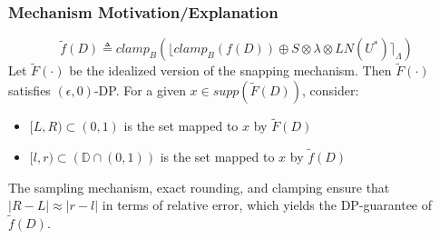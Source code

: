 \documentclass{beamer}
\begin{document}
\begin{frame}
    \frametitle{Mechanism Motivation/Explanation}
    \[ \tilde{f}(D) \triangleq clamp_{B} \left( \lfloor clamp_{B}(f(D)) \oplus S \otimes \lambda \otimes LN(U^*) \rceil_{\Lambda} \right) \]
        Let $\tilde{F}(\cdot)$ be the idealized version of the snapping mechanism. Then $\tilde{F}(\cdot)$ satisfies
        $(\epsilon,0)$-DP.
        For a given $x \in supp(\tilde{F}(D))$, consider:
              \begin{itemize}
                \item $[L,R) \subset (0,1)$ is the set mapped to $x$ by $\tilde{F}(D)$
                \item $[l,r) \subset \left( \mathbb{D} \cap (0,1) \right)$ is the set mapped to $x$ by $\tilde{f}(D)$
              \end{itemize}
              The sampling mechanism, exact rounding, and clamping ensure that
              $\vert R - L \vert \approx \vert r - l \vert$ in terms
              of relative error, which yields the DP-guarantee of $\tilde{f}(D)$.
\end{frame}
\end{document}
